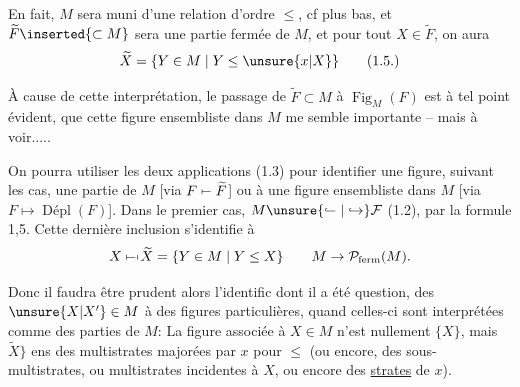   En fait, $M$ sera muni d'une relation d'ordre $\leq$, cf plus bas, et $\widetilde F\inserted{\subset M}$ sera une partie fermée de  $M$, et pour tout $X\in\widetilde F$,  on aura
\begingroup\makeatletter\tagsleft@true\let\veqno\@@leqno\makeatother
\[
\widetilde X=\{Y\in M\mid Y\leq\unsure{x|X}\}\tag*{(1.5.)}
\]
\endgroup

À cause de cette interprétation, le passage de $\widetilde F\subset M$ à $\operatorname{Fig}_{M}(F)$ est à tel point évident, que  cette figure ensembliste dans $M$ me semble  importante -- mais à voir.....


On pourra utiliser les deux applications (1.3) pour identifier une figure, suivant les cas,  une partie de $M$ [via $F\mapstochar\relbar\widetilde F$] ou à une figure ensembliste dans $M$ [via $F\mapsto\operatorname{\text{Dépl}}(F)$]. Dans le premier cas,   $M\unsure{\lhook\joinrel\relbar|\hookrightarrow}\mathcal{F}$ (1.2)\deleted{\unsure{(}}, par la formule 1,5. Cette dernière inclusion s'identifie à
\[
X\mathrel{\mapstochar\relbar\mapstochar}\widetilde X=\{Y\in M\mid Y\leq X\}
\qquad M\to\mathcal{P}_{\mathrm{ferm}}(M).
\]

Donc il faudra être prudent alors  l'identific dont il a été question, des $\unsure{X|X'}\in M$   à des figures particulières, quand celles-ci sont interprétées comme des parties de $M$: La figure associée à $X\in M$ n'est nullement $\{X\}$, mais $\widetilde X\rbrace$  ens des multistrates majorées par $x$ pour $\leq$ (ou encore, des sous-multistrates, ou multistrates incidentes à $X$, ou encore des  \uline{strates} de $x$).

